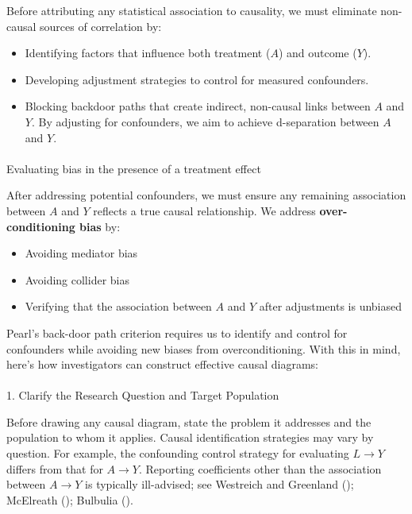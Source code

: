 \documentclass[
  singlecolumn]{article}
\makeatletter
\let\oldparagraph\paragraph
\renewcommand{\paragraph}{
    \@ifstar
      \xxxParagraphStar
      \xxxParagraphNoStar
  }
\newcommand{\xxxParagraphStar}[1]{\oldparagraph*{#1}\mbox{}}
\newcommand{\xxxParagraphNoStar}[1]{\oldparagraph{#1}\mbox{}}
\providecommand{\tightlist}{%
  \setlength{\itemsep}{0pt}\setlength{\parskip}{0pt}}\usepackage{longtable,booktabs,array}
\makeatother
\begin{document}
Before attributing any statistical association to causality, we must
eliminate non-causal sources of correlation by:

\begin{itemize}
\tightlist
\item
  Identifying factors that influence both treatment (\(A\)) and outcome
  (\(Y\)).
\item
  Developing adjustment strategies to control for measured confounders.
\item
  Blocking backdoor paths that create indirect, non-causal links between
  \(A\) and \(Y\). By adjusting for confounders, we aim to achieve
  d-separation between \(A\) and \(Y\).
\end{itemize}

\paragraph{Evaluating bias in the presence of a treatment
effect}\label{evaluating-bias-in-the-presence-of-a-treatment-effect}

After addressing potential confounders, we must ensure any remaining
association between \(A\) and \(Y\) reflects a true causal relationship.
We address \textbf{over-conditioning bias} by:

\begin{itemize}
\tightlist
\item
  Avoiding mediator bias
\item
  Avoiding collider bias
\item
  Verifying that the association between \(A\) and \(Y\) after
  adjustments is unbiased
\end{itemize}

Pearl's back-door path criterion requires us to identify and control for
confounders while avoiding new biases from overconditioning. With this
in mind, here's how investigators can construct effective causal
diagrams:

\paragraph{1. Clarify the Research Question and Target
Population}\label{clarify-the-research-question-and-target-population}

Before drawing any causal diagram, state the problem it addresses and
the population to whom it applies. Causal identification strategies may
vary by question. For example, the confounding control strategy for
evaluating \(L \to Y\) differs from that for \(A \to Y\). Reporting
coefficients other than the association between \(A \to Y\) is typically
ill-advised; see Westreich and Greenland
(); McElreath
(); Bulbulia
().
\end{document}
